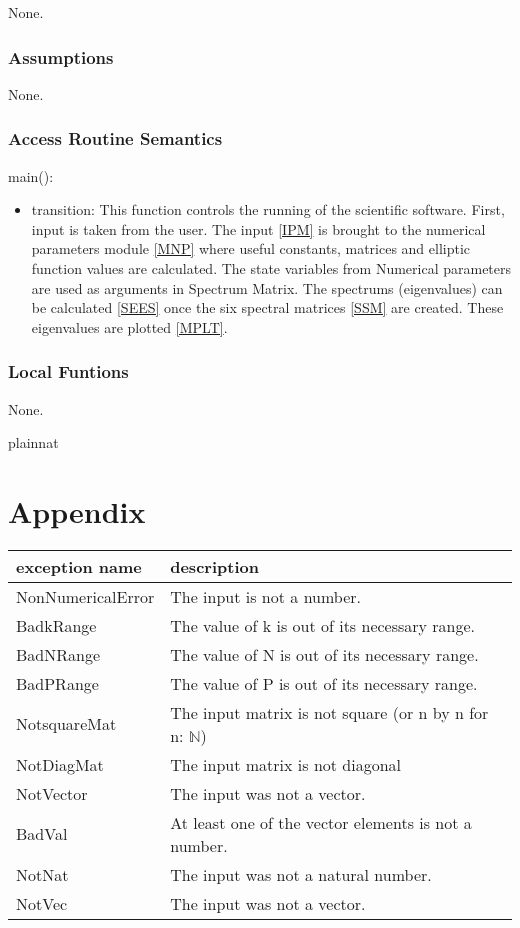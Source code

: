\documentclass[12pt, titlepage]{article}
\begin{document}
None.

\subsubsection{Assumptions}

None.

\subsubsection{Access Routine Semantics}

\noindent main():
\begin{itemize}
	\item transition: This function controls the running of the scientific 
	software. First, input is taken from the user. 
	The input \ref{IPM} is brought to the numerical parameters module \ref{MNP} 
	where useful 
	constants, matrices and elliptic function values are calculated. The state 
	variables from Numerical parameters are used as arguments in Spectrum 
	Matrix. The spectrums (eigenvalues) can be calculated \ref{SEES} once the 
	six spectral 
	matrices \ref{SSM} are created. These eigenvalues are plotted \ref{MPLT}. 
\end{itemize}

\subsubsection{Local Funtions} 

None. 

\newpage 


 {plainnat}
 

\newpage

\section{Appendix} \label{Appendix}

\renewcommand{\arraystretch}{1.2}
\begin{tabular}{l l} 
	\toprule		
	\textbf{exception name} & \textbf{description}\\
	\midrule 
	NonNumericalError & The input is not a number.\\ 
	BadkRange & The value of k is out of its necessary range.\\ 
	BadNRange & The value of N is out of its necessary range.\\ 
	BadPRange & The value of P is out of its necessary range.\\ 
	NotsquareMat & The input matrix is not square (or n by n for n: 
	$\mathbb{N}$)\\ 
	NotDiagMat & The input matrix is not diagonal \\ 
	NotVector & The input was not a vector. \\ 
	BadVal & At least one of the vector elements is not a number. \\ 
	NotNat & The input was not a natural number. \\
	NotVec & The input was not a vector.\\
	\bottomrule
\end{tabular}\\
\end{document}
